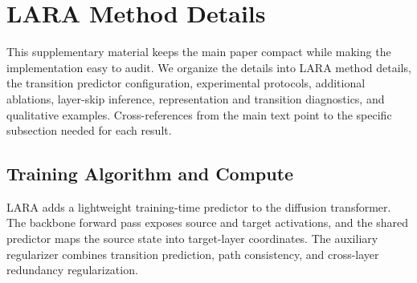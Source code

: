 \section{LARA Method Details}
\label{app:realign_algorithm_compute}

This supplementary material keeps the main paper compact while making the implementation easy to audit. We organize the details into LARA method details, the transition predictor configuration, experimental protocols, additional ablations, layer-skip inference, representation and transition diagnostics, and qualitative examples. Cross-references from the main text point to the specific subsection needed for each result.

\subsection{Training Algorithm and Compute}

LARA adds a lightweight training-time predictor to the diffusion transformer. The backbone forward pass exposes source and target activations, and the shared predictor maps the source state into target-layer coordinates. The auxiliary regularizer combines transition prediction, path consistency, and cross-layer redundancy regularization.

